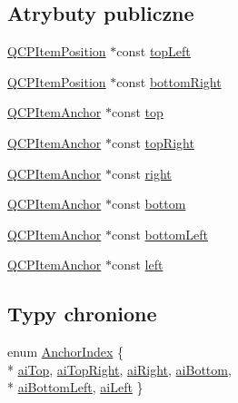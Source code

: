 \subsection*{Atrybuty publiczne}
\begin{DoxyCompactItemize}
\item 
\hyperlink{class_q_c_p_item_position}{Q\+C\+P\+Item\+Position} $\ast$const \hyperlink{class_q_c_p_item_rect_aa70feeef173489b03c3fbe906a5023c4}{top\+Left}
\item 
\hyperlink{class_q_c_p_item_position}{Q\+C\+P\+Item\+Position} $\ast$const \hyperlink{class_q_c_p_item_rect_a409f3bfe615a7e322bb3d4d193d85b26}{bottom\+Right}
\item 
\hyperlink{class_q_c_p_item_anchor}{Q\+C\+P\+Item\+Anchor} $\ast$const \hyperlink{class_q_c_p_item_rect_a96e50db552fb297d6fb62614676217bc}{top}
\item 
\hyperlink{class_q_c_p_item_anchor}{Q\+C\+P\+Item\+Anchor} $\ast$const \hyperlink{class_q_c_p_item_rect_a77e0eb6e4aa6efee620d35e2c21bdad7}{top\+Right}
\item 
\hyperlink{class_q_c_p_item_anchor}{Q\+C\+P\+Item\+Anchor} $\ast$const \hyperlink{class_q_c_p_item_rect_a7979c1915f61ad2609a9cc179c2e445e}{right}
\item 
\hyperlink{class_q_c_p_item_anchor}{Q\+C\+P\+Item\+Anchor} $\ast$const \hyperlink{class_q_c_p_item_rect_a99313bf2b338d9f81e19bd38082038aa}{bottom}
\item 
\hyperlink{class_q_c_p_item_anchor}{Q\+C\+P\+Item\+Anchor} $\ast$const \hyperlink{class_q_c_p_item_rect_abd8ee63fdf81f0c74bf7ccadee8603da}{bottom\+Left}
\item 
\hyperlink{class_q_c_p_item_anchor}{Q\+C\+P\+Item\+Anchor} $\ast$const \hyperlink{class_q_c_p_item_rect_aad0ca1af0c8debfc20d7b47fc942764d}{left}
\end{DoxyCompactItemize}
\subsection*{Typy chronione}
\begin{DoxyCompactItemize}
\item 
enum \hyperlink{class_q_c_p_item_rect_af0ebba58e6bca4851c4db726691ec0d3}{Anchor\+Index} \{ \\*
\hyperlink{class_q_c_p_item_rect_af0ebba58e6bca4851c4db726691ec0d3acaef33243034885d551dc9b8318ad326}{ai\+Top}, 
\hyperlink{class_q_c_p_item_rect_af0ebba58e6bca4851c4db726691ec0d3aa94843ce5935b36994005c1e1859ef60}{ai\+Top\+Right}, 
\hyperlink{class_q_c_p_item_rect_af0ebba58e6bca4851c4db726691ec0d3a69fa21fde2f44036381296a6f78b4eb4}{ai\+Right}, 
\hyperlink{class_q_c_p_item_rect_af0ebba58e6bca4851c4db726691ec0d3a2d294551e07179c4ac0c4e37364a1468}{ai\+Bottom}, 
\\*
\hyperlink{class_q_c_p_item_rect_af0ebba58e6bca4851c4db726691ec0d3ab3c42dbb1709a04ba9b03dcbf5a2537a}{ai\+Bottom\+Left}, 
\hyperlink{class_q_c_p_item_rect_af0ebba58e6bca4851c4db726691ec0d3a8a095c6d6b2e7665a15d9f40c94b47dc}{ai\+Left}
 \}
\end{DoxyCompactItemize}
